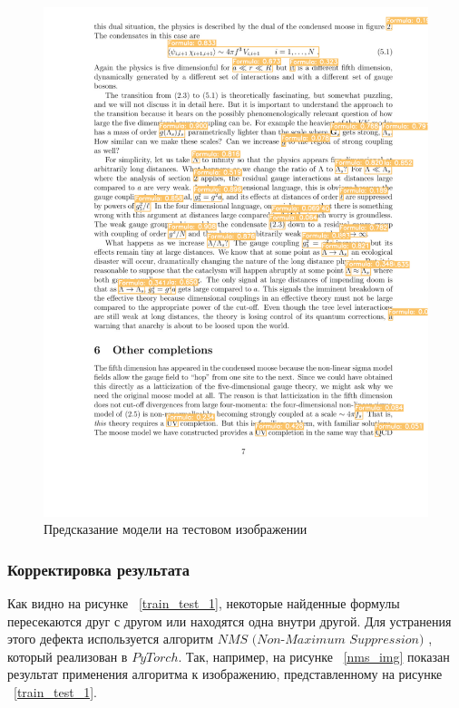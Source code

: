 \begin{figure}
    \includegraphics[scale=0.75]{img/train/test_2.png}
    \caption{Предсказание модели на тестовом изображении}
    \label{train_test_2}
\end{figure}

\subsubsection{Корректировка результата}
Как видно на рисунке ~\ref{train_test_1}, некоторые найденные формулы пересекаются друг с другом или находятся одна внутри другой. Для устранения этого дефекта используется алгоритм $\textit{NMS (Non-Maximum Suppression)}$ \cite{nms}, который реализован в $PyTorch$.
Так, например, на рисунке ~\ref{nms_img} показан результат применения алгоритма к изображению, представленному на рисунке ~\ref{train_test_1}.

